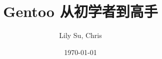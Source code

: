 \documentclass{book}
\author{Lily Su, Chris}
\date{\today}
\begin{document}
\title{Gentoo 从初学者到高手}
\maketitle
%
\frontmatter
\tableofcontents
%
 























\end{document}
